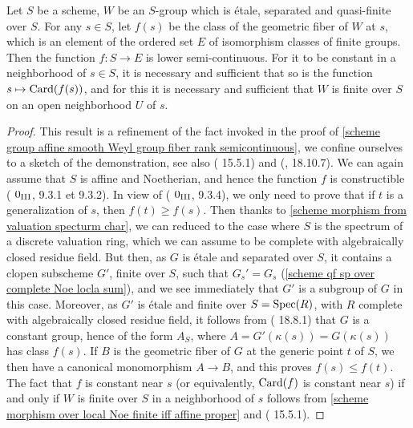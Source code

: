 \begin{lemma}\label{scheme group etale quasi-finite fiber type lower semicontinuous}
Let $S$ be a scheme, $W$ be an $S$-group which is \'etale, separated and quasi-finite over $S$. For any $s\in S$, let $f(s)$ be the class of the geometric fiber of $W$ at $s$, which is an element of the ordered set $E$ of isomorphism classes of finite groups. Then the function $f:S\to E$ is lower semi-continuous. For it to be constant in a neighborhood of $s\in S$, it is necessary and sufficient that so is the function $s\mapsto\mathrm{Card}(f(s))$, and for this it is necessary and sufficient that $W$ is finite over $S$ on an open neighborhood $U$ of $s$.
\end{lemma}
\begin{proof}
This result is a refinement of the fact invoked in the proof of \cref{scheme group affine smooth Weyl group fiber rank semicontinuous}, we confine ourselves to a sketch of the demonstration, see also (\cite{EGA4-3} 15.5.1) and (\cite{EGA4-4}, 18.10.7). We can again assume that $S$ is affine and Noetherian, and hence the function $f$ is constructible (\cite{EGA3-1} $0_{\Rmnum{3}}$, 9.3.1 et 9.3.2). In view of (\cite{EGA3-1} $0_{\Rmnum{3}}$, 9.3.4), we only need to prove that if $t$ is a generalization of $s$, then $f(t)\geq f(s)$. Then thanks to \cref{scheme morphism from valuation specturm char}, we can reduced to the case where $S$ is the spectrum of a discrete valuation ring, which we can assume to be complete with algebraically closed residue field. But then, as $G$ is \'etale and separated over $S$, it contains a clopen subscheme $G'$, finite over $S$, such that $G_s'=G_s$ (\cref{scheme qf sp over complete Noe locla sum}), and we see immediately that $G'$ is a subgroup of $G$ in this case. Moreover, as $G'$ is \'etale and finite over $S=\mathrm{Spec}(R)$, with $R$ complete with algebraically closed residue field, it follows from (\cite{EGA4-4} 18.8.1) that $G$ is a constant group, hence of the form $A_S$, where $A=G'(\kappa(s))=G(\kappa(s))$ has class $f(s)$. If $B$ is the geometric fiber of $G$ at the generic point $t$ of $S$, we then have a canonical monomorphism $A\to B$, and this proves $f(s)\leq f(t)$. The fact that $f$ is constant near $s$ (or equivalently, $\mathrm{Card}(f)$ is constant near $s$) if and only if $W$ is finite over $S$ in a neighborhood of $s$ follows from \cref{scheme morphism over local Noe finite iff affine proper} and (\cite{EGA4-3} 15.5.1). 
\end{proof}

